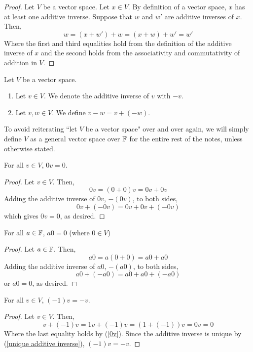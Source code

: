 \begin{proof}
    Let $V$ be a vector space. Let $x\in V$. By definition of a vector space, $x$ has at least one additive inverse. Suppose that $w$ and $w'$ are additive inverses of $x$. Then,
    \[ w = (x + w') + w = (x + w) + w' = w' \]
    Where the first and third equalities hold from the definition of the additive inverse of $x$ and the second holds from the associativity and commutativity of addition in $V$.
\end{proof}
\begin{definition}[Subtraction]
    Let $V$ be a vector space.
    \begin{enumerate}
        \item Let $v\in V$. We denote the additive inverse of $v$ with $-v$.
        \item Let $v,w\in V$. We define $v - w = v + (-w)$. 
    \end{enumerate}
\end{definition}
To avoid reiterating ``let $V$ be a vector space" over and over again, we will simply define $V$ as a general vector space over $\mathbb F$ for the entire rest of the notes, unless otherwise stated.
\begin{theorem}
    For all $v\in V$, $0v = 0$.
\end{theorem}
\begin{proof} \label{0v}
    Let $v\in V$. Then, 
    \[ 0v = (0+0)v = 0v + 0v \]
    Adding the additive inverse of $0v$, $-(0v)$, to both sides,
    \[ 0v + (-0v) = 0v + 0v + (-0v)\]
    which gives $0v = 0$, as desired.
\end{proof}
\begin{theorem}
    For all $a \in \mathbb F$, $a0 = 0$ (where $0\in V$)
\end{theorem}
\begin{proof}
    Let $a\in \mathbb F$. Then, 
    \[ a0 = a(0+0) = a0 + a0\]
    Adding the additive inverse of $a0$, $-(a0)$, to both sides,
    \[ a0 + (-a0) = a0 + a0 + (-a0)\]
    or $a0 = 0$, as desired.
\end{proof}
\begin{theorem}
    For all $v\in V$, $(-1)v = -v$.
\end{theorem}
\begin{proof}
    Let $v\in V$. Then,
    \[ v + (-1)v = 1v + (-1)v = (1 + (-1))v = 0v = 0\]
    Where the last equality holds by (\ref{0v}). Since the additive inverse is unique by (\ref{unique additive inverse}), $(-1)v = -v$.
\end{proof}
